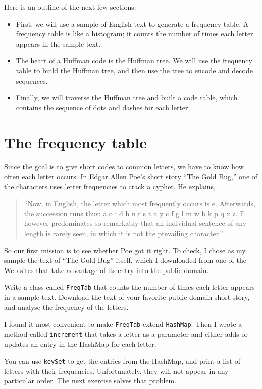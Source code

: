 Here is an outline of the next few sections:

\begin{itemize}

\item First, we will use a sample of English text to generate
a frequency table.  A frequency table is like a histogram; it counts
the number of times each letter appears in the sample text.

\item The heart of a Huffman code is the Huffman tree.  We will
use the frequency table to build the Huffman tree, and then use
the tree to encode and decode sequences.

\item Finally, we will traverse the Huffman tree and built a code
table, which contains the sequence of dots and dashes for each letter.

\end{itemize}


\section {The frequency table}
\label{freqtab}


Since the goal is to give short codes to common letters, we have to
know how often each letter occurs.  In Edgar Allen Poe's short story
``The Gold Bug,'' one of the characters uses letter frequencies to
crack a cypher.  He explains,

\begin{quote}
``Now, in English, the letter which most frequently occurs is
e. Afterwards, the succession runs thus: a o i d h n
r s t u y c f g l m w b k p q x z.  E however
predominates so remarkably that an individual
sentence of any length is rarely seen, in which it is
not the prevailing character.''
\end{quote}

So our first mission is to see whether Poe got it right.  To check,
I chose as my sample the text of ``The Gold Bug'' itself, which
I downloaded from one of the Web sites that take advantage
of its entry into the public domain.

\begin{exercise}
Write a class called {\tt FreqTab} that counts the number of
times each letter appears in a sample text.  Download the text
of your favorite public-domain short story, and analyse the frequency
of the letters.


I found it most convenient to make {\tt FreqTab} extend
{\tt HashMap}.  Then I wrote a method called {\tt increment}
that takes a letter as a parameter and either adds or updates
an entry in the HashMap for each letter.

You can use {\tt keySet} to get the entries from the HashMap,
and print a list of letters with their frequencies.  Unfortunately,
they will not appear in any particular order.  The next exercise
solves that problem.
\end{exercise}


